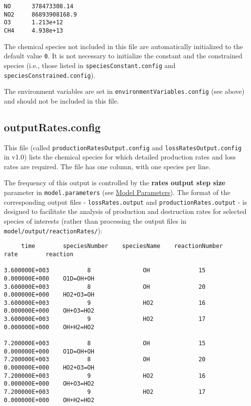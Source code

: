 \begin{verbatim}
NO      378473308.14
NO2     86893908168.9
O3      1.213e+12
CH4     4.938e+13
\end{verbatim}

The chemical species not included in this file are automatically
initialized to the default value \texttt{0}. It is not necessary to
initialize the constant and the constrained species (i.e., those
listed in \texttt{speciesConstant.config} and
\texttt{speciesConstrained.config}).

The environment variables are set in
\texttt{environmentVariables.config} (see above) and should not be
included in this file.

\subsection{outputRates.config} \label{subsec:outputrates}

This file (called \texttt{productionRatesOutput.config} and
\texttt{lossRatesOutput.config} in v1.0) lists the chemical species
for which detailed production rates and loss rates are required. The
file has one column, with one species per line.

The frequency of this output is controlled by the \textbf{rates output
  step size} parameter in \texttt{model.parameters} (see
\hyperref[sec:parameters]{Model Parameters}). The format of the
corresponding output files - \texttt{lossRates.output} and
\texttt{productionRates.output} - is designed to facilitate the
analysis of production and destruction rates for selected species of
interests (rather than processing the output files in
\texttt{model/output/reactionRates/}):

\begin{verbatim}
     time        speciesNumber    speciesName    reactionNumber         rate        reaction

3.600000E+003           8               OH              15         0.000000E+000    O1D=OH+OH
3.600000E+003           8               OH              20         0.000000E+000    HO2+O3=OH
3.600000E+003           9               HO2             16         0.000000E+000    OH+O3=HO2
3.600000E+003           9               HO2             17         0.000000E+000    OH+H2=HO2

7.200000E+003           8               OH              15         0.000000E+000    O1D=OH+OH
7.200000E+003           8               OH              20         0.000000E+000    HO2+O3=OH
7.200000E+003           9               HO2             16         0.000000E+000    OH+O3=HO2
7.200000E+003           9               HO2             17         0.000000E+000    OH+H2=HO2
\end{verbatim}


